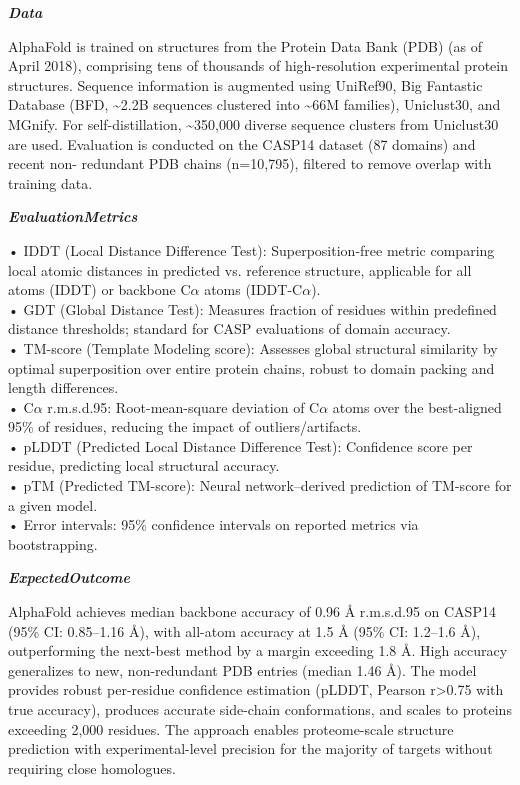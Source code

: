 \begin{tcolorbox}[
    breakable,
    title={Example of Idea Generation in Life},
    colback=LighterGray,
    colframe=DeepPurple,
    colbacktitle=DeepPurple,
    coltitle=White,
]
\textbf{\emph{\textcolor{CaseOrange}{Data}}}

AlphaFold is trained on structures from the Protein Data Bank (PDB) (as of April 2018), comprising
tens of thousands of high-resolution experimental protein structures. Sequence information is
augmented using UniRef90, Big Fantastic Database (BFD, \~{}2.2B sequences clustered into \~{}66M
families), Uniclust30, and MGnify. For self-distillation, \~{}350,000 diverse sequence clusters from
Uniclust30 are used. Evaluation is conducted on the CASP14 dataset (87 domains) and recent non-
redundant PDB chains (n=10,795), filtered to remove overlap with training data.

\textbf{\emph{\textcolor{CaseOrange}{EvaluationMetrics}}}

• IDDT (Local Distance Difference Test): Superposition-free metric comparing local atomic distances in predicted vs. reference structure, applicable for all atoms (IDDT) or backbone C$\alpha$ atoms (IDDT-C$\alpha$). \\
• GDT (Global Distance Test): Measures fraction of residues within predefined distance thresholds; standard for CASP evaluations of domain accuracy. \\
• TM-score (Template Modeling score): Assesses global structural similarity by optimal superposition over entire protein chains, robust to domain packing and length differences. \\
• C$\alpha$ r.m.s.d.95: Root-mean-square deviation of C$\alpha$ atoms over the best-aligned 95\% of residues, reducing the impact of outliers/artifacts. \\
• pLDDT (Predicted Local Distance Difference Test): Confidence score per residue, predicting local structural accuracy. \\
• pTM (Predicted TM-score): Neural network–derived prediction of TM-score for a given model. \\
• Error intervals: 95\% confidence intervals on reported metrics via bootstrapping. 

\textbf{\emph{\textcolor{CaseOrange}{ExpectedOutcome}}}

AlphaFold achieves median backbone accuracy of 0.96 Å r.m.s.d.95 on CASP14 (95\% CI: 0.85–1.16 Å),
with all-atom accuracy at 1.5 Å (95\% CI: 1.2–1.6 Å), outperforming the next-best method by a margin
exceeding 1.8 Å. High accuracy generalizes to new, non-redundant PDB entries (median 1.46 Å). The
model provides robust per-residue confidence estimation (pLDDT, Pearson r>0.75 with true accuracy),
produces accurate side-chain conformations, and scales to proteins exceeding 2,000 residues. The
approach enables proteome-scale structure prediction with experimental-level precision for the
majority of targets without requiring close homologues.

\end{tcolorbox}







